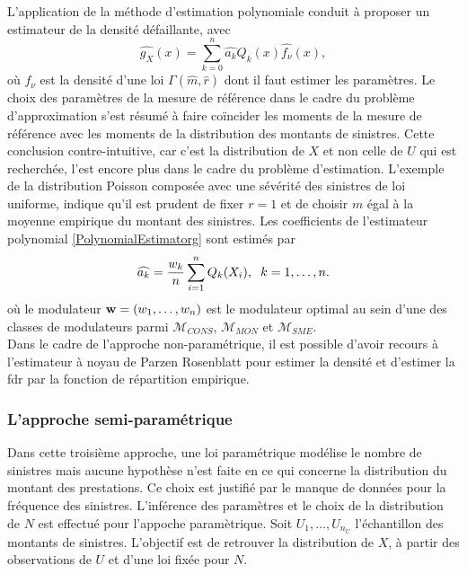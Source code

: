 L'application de la méthode d'estimation polynomiale  conduit à proposer un estimateur de la densité défaillante, avec 
\begin{equation}\label{PolynomialEstimatorg}
\widehat{g_{X}}(x)=\sum_{k=0}^{n}\widehat{a_{k}}Q_{k}(x)\widehat{f_{\nu}}(x),
\end{equation}
où $f_{\nu}$ est la densité d'une loi $\Gamma(\widehat{m},\widehat{r})$ dont il faut estimer les paramètres. Le choix des paramètres de la mesure de référence dans le cadre du problème d'approximation s'est résumé à faire coïncider les moments de la mesure de référence avec les moments de la distribution des montants de sinistres. Cette conclusion contre-intuitive, car c'est la distribution de $X$ et non celle de $U$ qui est recherchée, l'est encore plus dans le cadre du problème d'estimation. L'exemple de la distribution Poisson composée avec une sévérité des sinistres de loi uniforme, indique qu'il est prudent de fixer $r=1$ et de choisir $m$ égal à la moyenne empirique du montant des sinistres. Les coefficients de l'estimateur polynomial \eqref{PolynomialEstimatorg} sont estimés par 
\begin{equation}
\widehat{a_{k}}=\frac{w_{k}}{n}\sum_{i=1}^{n}Q_{k}(X_{i}),\hspace{0.2cm} k=1,\ldots,n.
\end{equation}
où le modulateur $\bold{w}=(w_{1},\ldots,w_{n})$ est le modulateur optimal au sein d'une des classes de modulateurs parmi $\mathcal{M}_{CONS}$, $\mathcal{M}_{MON}$ et $\mathcal{M}_{SME}$.\\

Dans le cadre de l'approche non-paramétrique, il est possible d'avoir recours à l'estimateur à noyau de Parzen Rosenblatt pour estimer la densité et d'estimer la \gls{fdr} par la fonction de répartition empirique.\\
 
\subsubsection{L'approche semi-paramétrique}       
Dans cette troisième approche, une loi paramétrique modélise le nombre de sinistres mais aucune hypothèse n'est faite en ce qui concerne la distribution du montant des prestations. Ce choix est justifié par le manque de données pour la fréquence des sinistres. L'inférence des paramètres et le choix de la distribution de $N$ est effectué pour l'appoche paramètrique. Soit $U_{1},\ldots,U_{n_{U}}$ l'échantillon des montants de sinistres. L'objectif est de retrouver la distribution de $X$, à partir des observations de $U$ et d'une loi fixée pour $N$.\\

